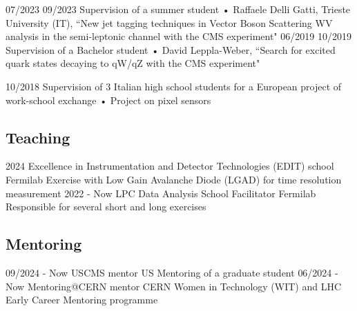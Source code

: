   \teaching
    {07/2023 \textemdash{} 09/2023}
    {Supervision of a summer student • }{Raffaele Delli Gatti, Trieste University (IT), ``New jet tagging techniques in Vector Boson Scattering WV analysis in the semi-leptonic channel with the CMS experiment"}
  \teaching
    {06/2019 \textemdash{} 10/2019}
    {Supervision of a Bachelor student • }{David Leppla-Weber, ``Search for excited quark states decaying to qW/qZ with the CMS experiment"}
      
  \teaching
    {10/2018}
    {Supervision of 3 Italian high school students for a European project of work-school exchange • }
    {Project on pixel sensors}
\subsection{Teaching}
\position
      {2024} 
      {Excellence in Instrumentation and Detector Technologies (EDIT) school}
      {Fermilab}
      {Exercise with Low Gain Avalanche Diode (LGAD) for time resolution measurement}
	\position
      {2022 - Now} 
      {LPC Data Analysis School Facilitator}
      {Fermilab}
      {Responsible for several short and long exercises}
\subsection{Mentoring}
	\position
      {09/2024 - Now } 
      {USCMS mentor}
      {US}
      {Mentoring of a graduate student}
	\position
      {06/2024 - Now } 
      {Mentoring@CERN mentor}
      {CERN}
      {Women in Technology (WIT) and LHC Early Career Mentoring programme}
